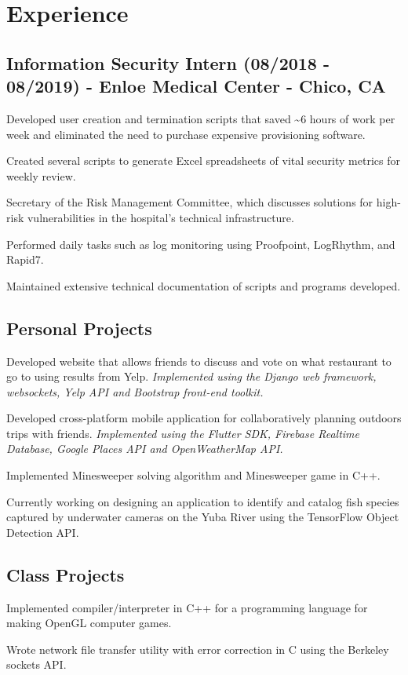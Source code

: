 \documentclass[letterpaper]{article}
\renewenvironment{itemize}{
  \begin{list}{}{
    \setlength{\leftmargin}{1.5em}
  }
}{
  \end{list}
}
\begin{document}
\section*{Experience}
\subsection*{Information Security Intern (08/2018 - 08/2019) - Enloe Medical Center - Chico, CA
}
\begin{itemize}
    \item[$\bullet$] Developed user creation and termination scripts that saved \textasciitilde 6 hours of work per week and eliminated the need to purchase expensive provisioning software.
 \item[$\bullet$] Created several scripts to generate Excel spreadsheets of vital security metrics for weekly review.
 \item[$\bullet$] Secretary of the Risk Management Committee, which discusses solutions for high-risk vulnerabilities in the hospital's technical infrastructure.
 \item[$\bullet$] Performed daily tasks such as log monitoring using Proofpoint, LogRhythm, and Rapid7.
 \item[$\bullet$] Maintained extensive technical documentation of scripts and programs developed.
\end{itemize}
\subsection*{Personal Projects}
\begin{itemize}
    \item[$\bullet$] Developed website that allows friends to discuss and vote on what restaurant to go to using results from Yelp. \emph{Implemented using the Django web framework, websockets, Yelp API and Bootstrap front-end toolkit.}
    \item[$\bullet$] Developed cross-platform mobile application for collaboratively planning outdoors trips with friends. \emph{Implemented using the Flutter SDK, Firebase Realtime Database, Google Places API and OpenWeatherMap API.}
    \item[$\bullet$] Implemented Minesweeper solving algorithm and Minesweeper game in C++.
    \item[$\bullet$] Currently working on designing an application to identify and catalog fish species captured by underwater cameras on the Yuba River using the TensorFlow Object Detection API.
\end{itemize}
\subsection*{Class Projects}
\begin{itemize}
    \item[$\bullet$] Implemented compiler/interpreter in C++ for a programming language for making OpenGL computer games.
    \item[$\bullet$] Wrote network file transfer utility with error correction in C using the Berkeley sockets API.
\end{itemize}
\end{document}
